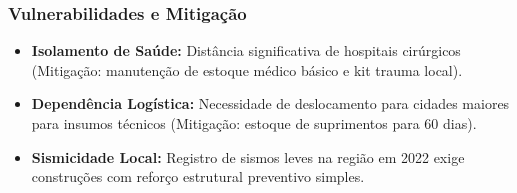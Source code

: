 \subsubsection{Vulnerabilidades e
Mitigação}

\begin{itemize}
\tightlist
\item
  \textbf{Isolamento de Saúde:} Distância significativa de hospitais
  cirúrgicos (Mitigação: manutenção de estoque médico básico e kit
  trauma local).
\item
  \textbf{Dependência Logística:} Necessidade de deslocamento para
  cidades maiores para insumos técnicos (Mitigação: estoque de
  suprimentos para 60 dias).
\item
  \textbf{Sismicidade Local:} Registro de sismos leves na região em 2022
  exige construções com reforço estrutural preventivo simples.
\end{itemize}

